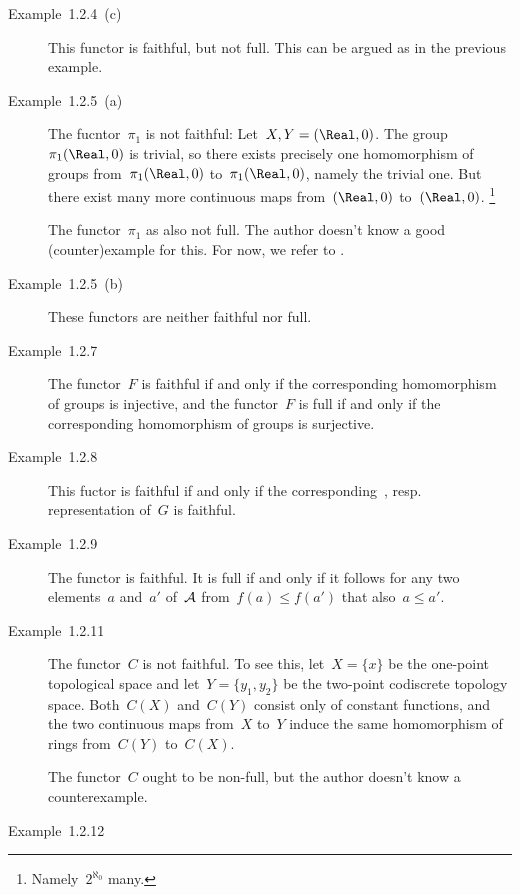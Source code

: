 \begin{description}
	\item[Example~1.2.4~(c)]
		This functor is faithful, but not full.
		This can be argued as in the previous example.

	\item[Example~1.2.5~(a)]
		The fucntor~$\pi_1$ is not faithful:
		Let~$X, Y = (\Real, 0)$.
		The group~$\pi_1(\Real, 0)$ is trivial, so there exists precisely one homomorphism of groups from~$\pi_1(\Real, 0)$ to~$\pi_1(\Real, 0)$, namely the trivial one.
		But there exist many more continuous maps from~$(\Real, 0)$ to~$(\Real, 0)$.%
		\footnote{
			Namely~$2^{\aleph_0}$ many.
		}
		
		The functor~$\pi_1$ as also not full.
		The author doesn’t know a good (counter)example for this.
		For now, we refer to \cite{stackexchange_pi_1_not_full}.

	\item[Example~1.2.5~(b)]
		These functors are neither faithful nor full.

	\item[Example~1.2.7]
		The functor~$F$ is faithful if and only if the corresponding homomorphism of groups is injective, and the functor~$F$ is full if and only if the corresponding homomorphism of groups is surjective.

	\item[Example~1.2.8]
		This fuctor is faithful if and only if the corresponding~, resp. representation of~$G$ is faithful.

	\item[Example~1.2.9]
		The functor is faithful.
		It is full if and only if it follows for any two elements~$a$ and~$a'$ of~$\mathcal{A}$ from~$f(a) \leq f(a')$ that also~$a \leq a'$.

	\item[Example~1.2.11]
		The functor~$C$ is not faithful.
		To see this, let~$X = \{ x \}$ be the one-point topological space and let~$Y= \{ y_1, y_2 \}$ be the two-point codiscrete topology space.
		Both~$C(X)$ and~$C(Y)$ consist only of constant functions, and the two continuous maps from~$X$ to~$Y$ induce the same homomorphism of rings from~$C(Y)$ to~$C(X)$.
		
		The functor~$C$ ought to be non-full, but the author doesn’t know a counterexample.

	\item[Example~1.2.12]


\end{description}
